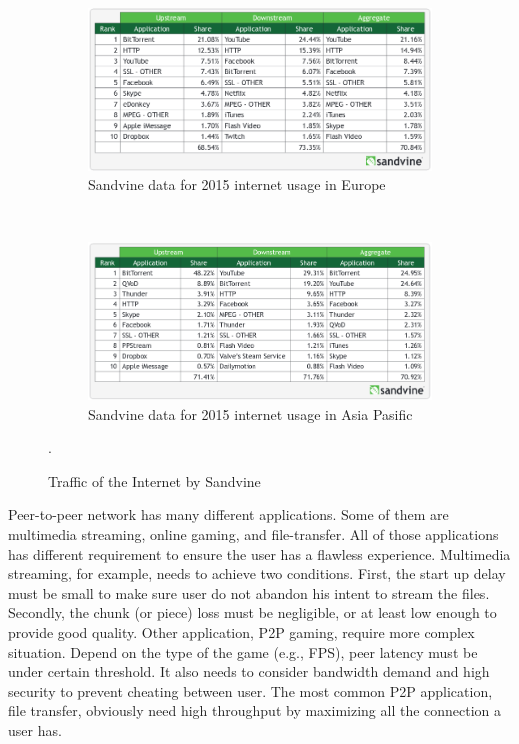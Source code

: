 \begin{figure}[h]
	\centering
	\begin{subfigure}[b]{0.8\textwidth}
		\includegraphics[width=\linewidth]{pics/sandvineeu2015}
		\caption{Sandvine data for 2015 internet usage in Europe}
		\label{fig:usage1}
	\end{subfigure}\\
	\begin{subfigure}[b]{0.8\textwidth}
		\includegraphics[width=\linewidth]{pics/sandvineasia2015}
		\caption{Sandvine data for 2015 internet usage in Asia Pasific}
		\label{fig:usage2}
	\end{subfigure}%
	\caption{Traffic of the Internet by Sandvine \cite{2015:internettraffic:sandvine}}.
	\label{fig:usage}
\end{figure}

Peer-to-peer network has many different applications. Some of them are multimedia streaming, online gaming, and file-transfer. All of those applications has different requirement to ensure the user has a flawless experience. Multimedia streaming, for example, needs to achieve two conditions. First, the start up delay must be small to make sure user do not abandon his intent to stream the files. Secondly, the chunk (or piece) loss must be negligible, or at least low enough to provide good quality\cite{2008:givetogetvod:Mol}. Other application, P2P gaming, require more complex situation. Depend on the type of the game (e.g., FPS), peer latency must be under certain threshold\cite{2010:surveyp2pgame:shen}. It also needs to consider bandwidth demand and high security to prevent cheating between user. The most common P2P application, file transfer, obviously need high throughput by maximizing all the connection a user has.

